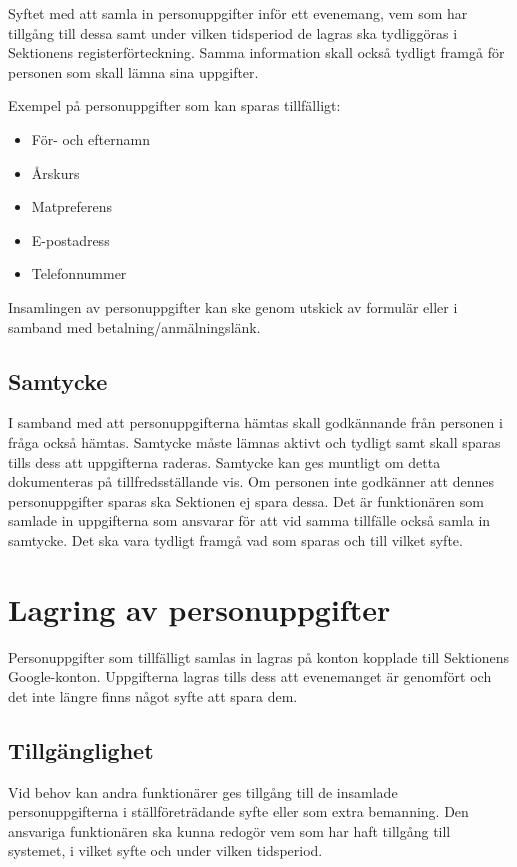 \documentclass{dsekprotokoll}
\begin{document}
Syftet med att samla in personuppgifter inför ett evenemang, vem som har tillgång till dessa samt under vilken tidsperiod de lagras ska tydliggöras i Sektionens registerförteckning. Samma information skall också tydligt framgå för personen som skall lämna sina uppgifter.

Exempel på personuppgifter som kan sparas tillfälligt:
\begin{itemize}
    \item För- och efternamn
    \item Årskurs
    \item Matpreferens
    \item E-postadress
    \item Telefonnummer
\end{itemize}

Insamlingen av personuppgifter kan ske genom utskick av formulär eller i samband med betalning/anmälningslänk.

\subsection{Samtycke}

I samband med att personuppgifterna hämtas skall godkännande från personen i fråga också hämtas. Samtycke måste lämnas aktivt och tydligt samt skall sparas tills dess att uppgifterna raderas. Samtycke kan ges muntligt om detta dokumenteras på tillfredsställande vis. Om personen inte godkänner att dennes personuppgifter sparas ska Sektionen ej spara dessa. Det är funktionären som samlade in uppgifterna som
ansvarar för att vid samma tillfälle också samla in samtycke. Det ska vara tydligt framgå vad som sparas och till vilket syfte.

\section{Lagring av personuppgifter}
Personuppgifter som tillfälligt samlas in lagras på konton kopplade till Sektionens Google-konton. Uppgifterna lagras tills dess att evenemanget är genomfört och det inte längre finns något syfte att spara dem.

\subsection{Tillgänglighet}

Vid behov kan andra funktionärer ges tillgång
till de insamlade personuppgifterna i ställföreträdande syfte eller som extra bemanning. Den ansvariga funktionären ska kunna
redogör vem som har haft tillgång till systemet, i vilket syfte och under vilken tidsperiod.
\end{document}
